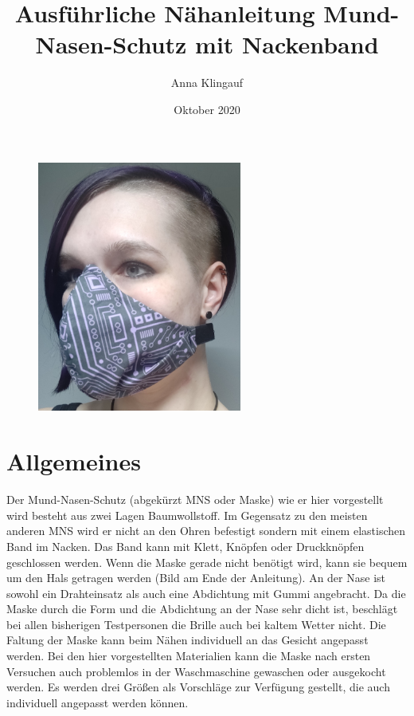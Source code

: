 \documentclass[12pt,parskip=full]{scrartcl}
\title{Ausführliche Nähanleitung Mund-Nasen-Schutz mit Nackenband}
\author{Anna Klingauf}
\date{Oktober 2020}
\begin{document}
\begin{titlepage}
\maketitle
\thispagestyle{empty}
\begin{figure}[b!] 
  \centering
     \includegraphics[width=0.60\textwidth]{Pictures/00_Completed/Gesamt_resized.jpg}
\end{figure}
\end{titlepage}
\clearpage

\section*{Allgemeines}
Der Mund-Nasen-Schutz (abgekürzt MNS oder Maske) wie er hier vorgestellt wird besteht aus zwei Lagen Baumwollstoff. Im Gegensatz zu den meisten anderen MNS wird er nicht an den Ohren befestigt sondern mit einem elastischen Band im Nacken. Das Band kann mit Klett, Knöpfen oder Druckknöpfen geschlossen werden. Wenn die Maske gerade nicht benötigt wird, kann sie bequem um den Hals getragen werden (Bild am Ende der Anleitung). An der Nase ist sowohl ein Drahteinsatz als auch eine Abdichtung mit Gummi angebracht. Da die Maske durch die Form und die Abdichtung an der Nase sehr dicht ist, beschlägt bei allen bisherigen Testpersonen die Brille auch bei kaltem Wetter nicht. Die Faltung der Maske kann beim Nähen individuell an das Gesicht angepasst werden. Bei den hier vorgestellten Materialien kann die Maske nach ersten Versuchen auch problemlos in der Waschmaschine gewaschen oder ausgekocht werden. Es werden drei Größen als Vorschläge zur Verfügung gestellt, die auch individuell angepasst werden können. \par
\end{document}
